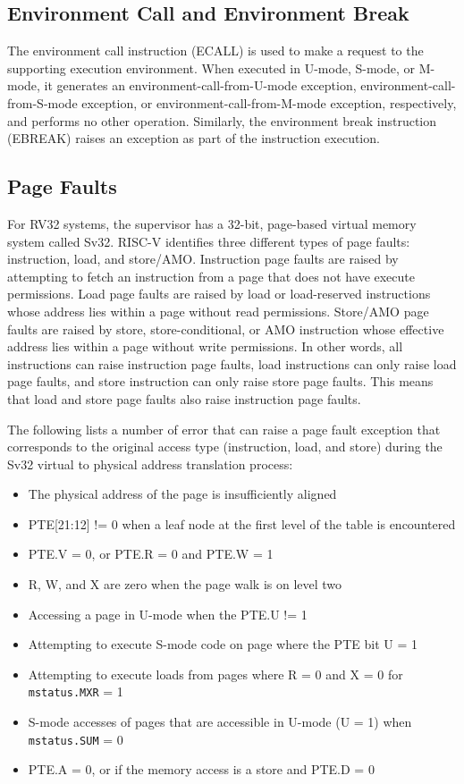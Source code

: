 \documentclass[12pt]{article}
\begin{document}
\subsection{Environment Call and Environment Break}
The environment call instruction (ECALL) is used to make a request to the supporting execution environment. When executed in U-mode, S-mode, or M-mode, it generates an environment-call-from-U-mode exception, environment-call-from-S-mode exception, or environment-call-from-M-mode exception, respectively, and performs no other operation. Similarly, the environment break instruction (EBREAK) raises an exception as part of the instruction execution.

\subsection{Page Faults}
For RV32 systems, the supervisor has a 32-bit, page-based virtual memory system called Sv32. RISC-V identifies three different types of page faults: instruction, load, and store/AMO. Instruction page faults are raised by attempting to fetch an instruction from a page that does not have execute permissions. Load page faults are raised by load or load-reserved instructions whose address lies within a page without read permissions. Store/AMO page faults are raised by store, store-conditional, or AMO instruction whose effective address lies within a page without write permissions. In other words, all instructions can raise instruction page faults, load instructions can only raise load page faults, and store instruction can only raise store page faults. This means that load and store page faults also raise instruction page faults. 

The following lists a number of error that can raise a page fault exception that corresponds to the original access type (instruction, load, and store) during the Sv32 virtual to physical address translation process:
\begin{itemize}
    \item The physical address of the page is insufficiently aligned
    \item PTE[21:12] != 0 when a leaf node at the first level of the table is encountered
    \item PTE.V = 0, or PTE.R = 0 and PTE.W = 1
    \item R, W, and X are zero when the page walk is on level two
    \item Accessing a page in U-mode when the PTE.U != 1
    \item Attempting to execute S-mode code on page where the PTE bit U = 1
    \item Attempting to execute loads from pages where R = 0 and X = 0 for {\tt{mstatus.MXR}} = 1
    \item S-mode accesses of pages that are accessible in U-mode (U = 1) when {\tt{mstatus.SUM}} = 0
    \item PTE.A = 0, or if the memory access is a store and PTE.D = 0
\end{itemize}
\end{document}
